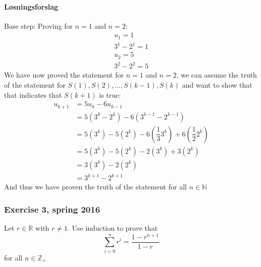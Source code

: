 \paragraph*{Løsningsforslag}
Base step: Proving for $n=1$ and $n=2$:
\begin{align*}
    u_1 = 1\\
    3^1-2^1 = 1\\
    u_2 = 5\\
    3^2-2^2 = 5
\end{align*}
We have now proved the statement for $n=1$ and $n=2$, we can assume the truth of the statement for $S(1), S(2), \dots,S(k-1), S(k)$ and want to show that that indicates that $S(k+1)$ is true:
\begin{align*}
    u_{k+1} &= 5u_{k}-6u_{k-1}\\
    &= 5(3^k-2^k)-6(3^{k-1}-2^{k-1})\\
    &= 5(3^k)-5(2^k)-6(\dfrac{1}{3}3^k)+6(\dfrac{1}{2}2^k)\\
    &= 5(3^k)-5(2^k)-2(3^k)+3(2^k)\\
    &= 3(3^k)-2(2^k)\\
    &= 3^{k+1}-2^{k+1}
\end{align*}
And thus we have proven the truth of the statement for all $n \in \mathbb{N}$

\subsubsection{Exercise 3, spring 2016}
Let $r\in\mathbb{R}$ with $r\neq 1$. Use induction to prove that
\[
\sum_{i=0}^{n}r^i = \frac{1-r^{n+1}}{1-r}    
\]
for all $n\in \mathbb{Z}_+$